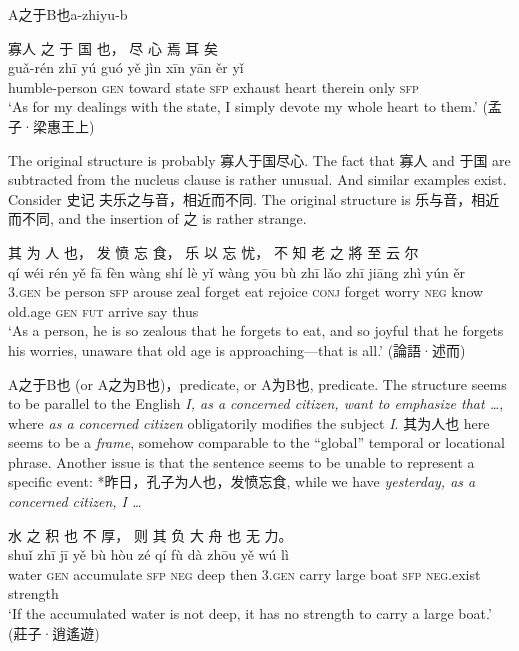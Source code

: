 \documentclass[UTF8, a4paper, oneside, scheme=plain, 12pt]{ctexrep}
\newcommand{\form}[1]{\emph{#1}}
\newcommand{\translate}[1]{`#1'}
\newcommand*{\category}[1]{\textsc{#1}}
\begin{document}
\begin{todobox}{A之于B也}{a-zhiyu-b}
    \begin{exe}
        \ex
        \glll 寡人 之 于 国 也， 尽 心 焉 耳 矣 \\
        guǎ-rén zhī yú guó yě jìn xīn yān ěr yǐ \\
        humble-person \category{gen} toward state \category{sfp} exhaust heart therein only \category{sfp} \\
        \glt\translate{As for my dealings with the state, I simply devote my whole heart to them.} \hfill (孟子·梁惠王上)
    \end{exe}
    The original structure is probably 寡人于国尽心.
    The fact that 寡人 and 于国 are subtracted from the nucleus clause is rather unusual.
    And similar examples exist.
    Consider 史记 夫乐之与音，相近而不同.
    The original structure is 乐与音，相近而不同,
    and the insertion of 之 is rather strange.

    \begin{exe}
        \ex
        \glll 其 为 人 也， 发 愤 忘 食， 乐 以 忘 忧， 不 知 老 之 將 至 云 尔 \\
        qí wéi rén yě fā fèn wàng shí lè yǐ wàng yōu bù zhī lǎo zhī jiāng zhì yún ěr \\
        3.\category{gen} be person \category{sfp} arouse zeal forget eat rejoice \category{conj} forget worry \category{neg} know old.age \category{gen} \category{fut} arrive say thus \\
        \glt\translate{As a person, he is so zealous that he forgets to eat, and so joyful that he forgets his worries, unaware that old age is approaching---that is all.} \hfill (論語·述而)
    \end{exe}

    A之于B也 (or A之为B也)，predicate, or A为B也, predicate.
    The structure seems to be parallel to the English
    \form{I, as a concerned citizen, want to emphasize that \dots},
    where \form{as a concerned citizen} obligatorily modifies the subject \form{I}.
    其为人也 here seems to be a \emph{frame}, somehow comparable to the ``global'' temporal or locational phrase.
    Another issue is that the sentence seems to be unable to represent a specific event:
    *昨日，孔子为人也，发愤忘食, while we have \form{yesterday, as a concerned citizen, I \dots}
    
    \begin{exe}
        \ex
        \glll 水 之 积 也 不 厚， 则 其 负 大 舟 也 无 力。 \\
        shuǐ zhī jī yě bù hòu zé qí fù dà zhōu yě wú lì \\
        water \category{gen} accumulate \category{sfp} \category{neg} deep then 3.\category{gen} carry large boat \category{sfp} \category{neg}.exist strength \\
        \glt\translate{If the accumulated water is not deep, it has no strength to carry a large boat.} \hfill (莊子·逍遙遊)
    \end{exe}

\end{todobox}
\end{document}
